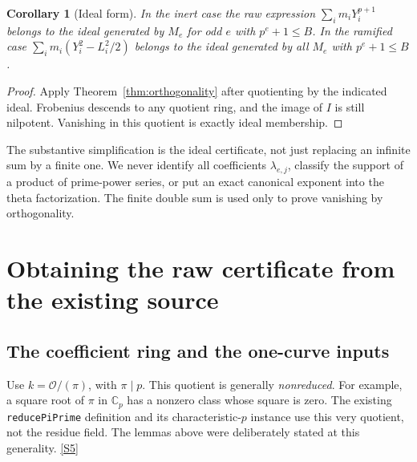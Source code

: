 \documentclass[11pt,letterpaper]{article}
\newtheorem{corollary}[theorem]{Corollary}
\theoremstyle{remark}
\newcommand{\OO}{\mathcal O}
\newcommand{\code}[1]{{\small\nolinkurl{#1}}}
\newcommand{\src}[1]{\hyperref[src:#1]{[S#1]}}
\begin{document}
\begin{corollary}[Ideal form]
\label{cor:ideal}
In the inert case the raw expression \(\sum_i m_iY_i^{p+1}\) belongs to the
ideal generated by \(M_e\) for odd \(e\) with \(p^e+1\le B\). In the ramified
case \(\sum_i m_i(Y_i^2-L_i^2/2)\) belongs to the ideal generated by all
\(M_e\) with \(p^e+1\le B\).
\end{corollary}
\begin{proof}
Apply Theorem~\ref{thm:orthogonality} after quotienting by the indicated ideal.
Frobenius descends to any quotient ring, and the image of \(I\) is still
nilpotent. Vanishing in this quotient is exactly ideal membership.
\end{proof}

The substantive simplification is the ideal certificate, not just replacing an
infinite sum by a finite one. We never identify all coefficients
\(\lambda_{e,j}\), classify the support of a product of prime-power series, or
put an exact canonical exponent into the theta factorization. The finite double
sum is used only to prove vanishing by orthogonality.

\section{Obtaining the raw certificate from the existing source}
\label{sec:raw}

\subsection{The coefficient ring and the one-curve inputs}

Use \(k=\OO/(\pi)\), with \(\pi\mid p\). This quotient is generally
\emph{nonreduced}. For example, a square root of \(\pi\) in \(\mathbb C_p\)
has a nonzero class whose square is zero. The existing \code{reducePiPrime}
definition and its characteristic-\(p\) instance use this very quotient, not
the residue field. The lemmas above were deliberately stated at this generality.
\src{5}
\end{document}
